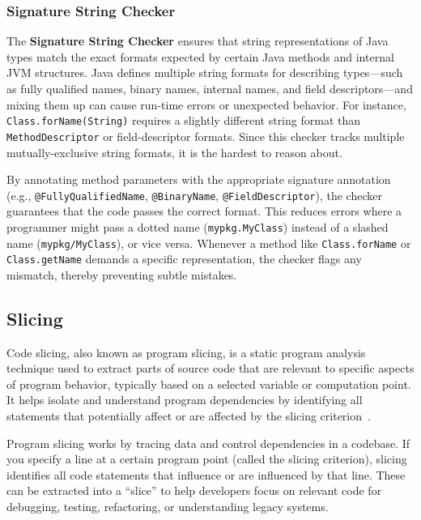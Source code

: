 \documentclass[acmsmall,screen,review,anonymous]{acmart}
\makeatletter
\newcommand{\atmark}[1]{\texttt{@#1}}
\makeatother
\begin{document}
\subsubsection{Signature String Checker}
\label{sec:signature}

The \textbf{Signature String Checker} ensures that string representations of Java types match the exact formats expected by certain Java methods and internal JVM structures. Java defines multiple string formats for describing types---such as fully qualified names, binary names, internal names, and field descriptors---and mixing them up can cause run-time errors or unexpected behavior. For instance, \texttt{Class.forName(String)} requires a slightly different string format than \texttt{MethodDescriptor} or field-descriptor formats. Since this checker tracks multiple mutually-exclusive string formats, it is the hardest to reason about.

By annotating method parameters with the appropriate signature annotation (e.g., \atmark{FullyQualifiedName}, \atmark{BinaryName}, \atmark{FieldDescriptor}), the checker guarantees that the code passes the correct format. This reduces errors where a programmer might pass a dotted name (\texttt{mypkg.MyClass}) instead of a slashed name (\texttt{mypkg/MyClass}), or vice versa. Whenever a method like \texttt{Class.forName} or \texttt{Class.getName} demands a specific representation, the checker flags any mismatch, thereby preventing subtle mistakes.

\subsection{Slicing}
\label{sec:slicing}

Code slicing, also known as program slicing, is a static program analysis technique used to extract parts of source code that are relevant to specific aspects of program behavior, typically based on a selected variable or computation point. It helps isolate and understand program dependencies by identifying all statements that potentially affect or are affected by the slicing criterion~\cite{mohsin2010program}.

Program slicing works by tracing data and control dependencies in a codebase. If you specify a line at a certain program point (called the slicing criterion), slicing identifies all code statements that influence or are influenced by that line. These can be extracted into a ``slice'' to help developers focus on relevant code for debugging, testing, refactoring, or understanding legacy systems.
\end{document}
